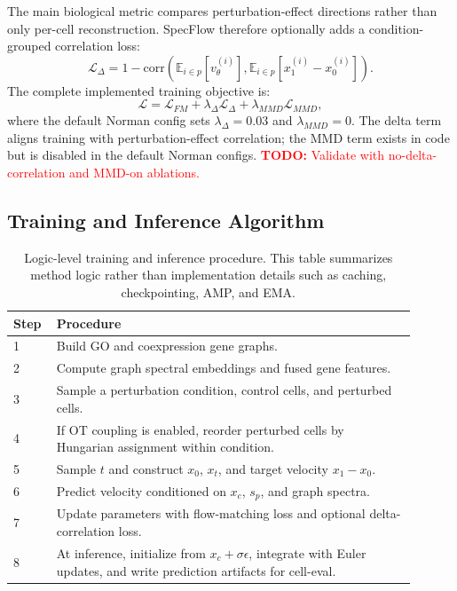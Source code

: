 \documentclass[11pt]{article}
\newcommand{\method}{SpecFlow}
\newcommand{\todo}[1]{\textcolor{red}{\textbf{TODO:} #1}}
\begin{document}
The main biological metric compares perturbation-effect directions rather than only per-cell reconstruction.
\method{} therefore optionally adds a condition-grouped correlation loss:
\[
\mathcal{L}_{\Delta}
= 1 -
\mathrm{corr}\left(
\mathbb{E}_{i \in p}[v_\theta^{(i)}],
\mathbb{E}_{i \in p}[x_1^{(i)} - x_0^{(i)}]
\right).
\]
The complete implemented training objective is:
\[
\mathcal{L}
= \mathcal{L}_{FM}
+ \lambda_{\Delta}\mathcal{L}_{\Delta}
+ \lambda_{MMD}\mathcal{L}_{MMD},
\]
where the default Norman config sets $\lambda_{\Delta}=0.03$ and $\lambda_{MMD}=0$.
The delta term aligns training with perturbation-effect correlation; the MMD term exists in code but is disabled in the default Norman configs.
\todo{Validate with no-delta-correlation and MMD-on ablations.}

\subsection{Training and Inference Algorithm}

\begin{table}[t]
\centering
\caption{Logic-level training and inference procedure. This table summarizes method logic rather than implementation details such as caching, checkpointing, AMP, and EMA.}
\label{tab:algorithm}
\begin{tabular}{p{0.08\linewidth}p{0.82\linewidth}}
\toprule
Step & Procedure \\
\midrule
1 & Build GO and coexpression gene graphs. \\
2 & Compute graph spectral embeddings and fused gene features. \\
3 & Sample a perturbation condition, control cells, and perturbed cells. \\
4 & If OT coupling is enabled, reorder perturbed cells by Hungarian assignment within condition. \\
5 & Sample $t$ and construct $x_0$, $x_t$, and target velocity $x_1-x_0$. \\
6 & Predict velocity conditioned on $x_c$, $s_p$, and graph spectra. \\
7 & Update parameters with flow-matching loss and optional delta-correlation loss. \\
8 & At inference, initialize from $x_c+\sigma\epsilon$, integrate with Euler updates, and write prediction artifacts for cell-eval. \\
\bottomrule
\end{tabular}
\end{table}
\end{document}
